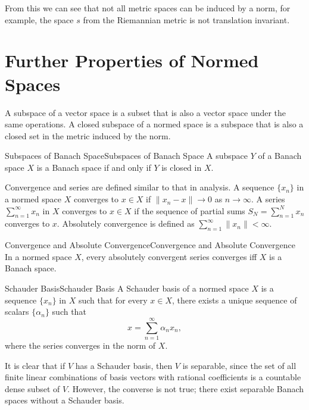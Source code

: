 \documentclass[../main.tex]{subfiles}
\begin{document}
From this we can see that not all metric spaces can be induced by a norm, for example, the space $s$ from the Riemannian metric is not translation invariant.

\section{Further Properties of Normed Spaces}
A subspace of a vector space is a subset that is also a vector space under the same operations. A closed subspace of a normed space is a subspace that is also a closed set in the metric induced by the norm.

\begin{theorem}{Subspaces of Banach Space}{Subspaces of Banach Space}
	A subspace $Y$ of a Banach space $X$ is a Banach space if and only if $Y$ is closed in $X$.
\end{theorem}

Convergence and series are defined similar to that in analysis. A sequence $\{x_n\}$ in a normed space $X$ converges to $x \in X$ if $\|x_n - x\| \rightarrow 0$ as $n \rightarrow \infty$. A series $\sum_{n=1}^\infty x_n$ in $X$ converges to $x \in X$ if the sequence of partial sums $S_N = \sum_{n=1}^N x_n$ converges to $x$. Absolutely convergence is defined as $\sum_{n=1}^\infty \|x_n\| < \infty$.

\begin{theorem}{Convergence and Absolute Convergence}{Convergence and Absolute Convergence}
	In a normed space $X$, every absolutely convergent series converges iff $X$ is a Banach space.
\end{theorem}

\begin{definition}{Schauder Basis}{Schauder Basis}
	A Schauder basis of a normed space $X$ is a sequence $\{x_n\}$ in $X$ such that for every $x \in X$, there exists a unique sequence of scalars $\{\alpha_n\}$ such that
	\begin{equation*}
		x = \sum_{n=1}^\infty \alpha_n x_n,
	\end{equation*}
	where the series converges in the norm of $X$.
\end{definition}

It is clear that if $V$ has a Schauder basis, then $V$ is separable, since the set of all finite linear combinations of basis vectors with rational coefficients is a countable dense subset of $V$. However, the converse is not true; there exist separable Banach spaces without a Schauder basis.
\end{document}
